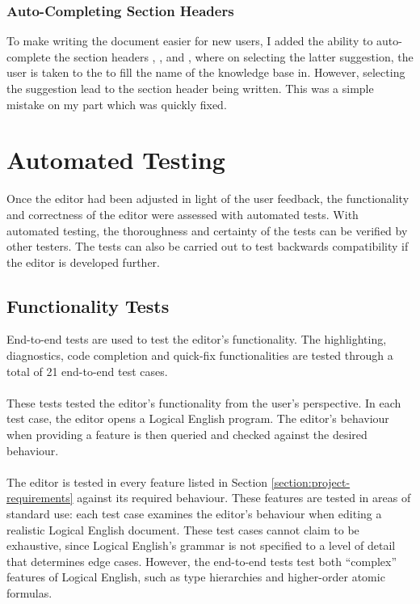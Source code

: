 \documentclass[../main.tex]{subfiles}
\begin{document}
\subsubsection{Auto-Completing Section Headers}
To make writing the document easier for new users, I added the ability to auto-complete the section headers , , and , where on selecting the latter suggestion, the user is taken to the \codeword{_} to fill the name of the knowledge base in. However, selecting the suggestion  lead to the section header  being written. This was a simple mistake on my part which was quickly fixed.


\section{Automated Testing}
Once the editor had been adjusted in light of the user feedback, the functionality and correctness of the editor were assessed with automated tests. With automated testing, the thoroughness and certainty of the tests can be verified by other testers. The tests can also be carried out to test backwards compatibility if the editor is developed further.

\subsection{Functionality Tests}
End-to-end tests are used to test the editor's functionality. The highlighting, diagnostics, code completion and quick-fix functionalities are tested through a total of 21 end-to-end test cases. 
\\
\\
These tests tested the editor's functionality from the user's perspective. In each test case, the editor opens a Logical English program. The editor's behaviour when providing a feature is then queried and checked against the desired behaviour.
\\
\\
The editor is tested in every feature listed in Section \ref{section:project-requirements} against its required behaviour. These features are tested in areas of standard use: each test case examines the editor's behaviour when editing a realistic Logical English document. These test cases cannot claim to be exhaustive, since Logical English's grammar is not specified to a level of detail that determines edge cases. However, the end-to-end tests test both  ``complex'' features of Logical English, such as type hierarchies and higher-order atomic formulas.
\end{document}
